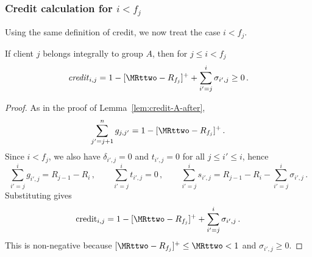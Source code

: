 \subsubsection{Credit calculation for \texorpdfstring{$i < f_j$}{i < f\_j}}

Using the same definition of credit, we now treat the case $i < f_j$.


\begin{lemma}
    \label{lem:credit-A-before}
    If client $j$ belongs integrally to group $A$, then for $j \leq i < f_j$
    \begin{equation*}
        \text{\emph{credit}}_{i,j} = 1 - [\MRttwo - R_{f_j}]^+ + \sum_{i'=j}^i \sigma_{i',j} \ge 0\,.
    \end{equation*}
\end{lemma}
\begin{proof}
    As in the proof of Lemma~\ref{lem:credit-A-after},
    \begin{equation*}
        \sum_{j'=j+1}^n g_{j,j'} = 1 - [\MRttwo - R_{f_j}]^+\,.
    \end{equation*}
    Since $i<f_j$, we also have $\delta_{i',j}=0$ and $t_{i',j}=0$ for all $j \le i' \le i$, hence
    \begin{equation*}
        \sum_{i'=j}^{i} g_{i',j} = R_{j-1}-R_i\,,
        \qquad
        \sum_{i'=j}^{i} t_{i',j}=0\,,
        \qquad
        \sum_{i'=j}^{i} s_{i',j} = R_{j-1}-R_i-\sum_{i'=j}^{i} \sigma_{i',j}\,.
    \end{equation*}
    Substituting gives
    \begin{equation*}
        \text{credit}_{i,j} = 1 - [\MRttwo - R_{f_j}]^+ + \sum_{i'=j}^{i} \sigma_{i',j}\,.
    \end{equation*}
    This is non-negative because $[\MRttwo-R_{f_j}]^+ \le \MRttwo < 1$ and $\sigma_{i',j} \ge 0$.
\end{proof}

